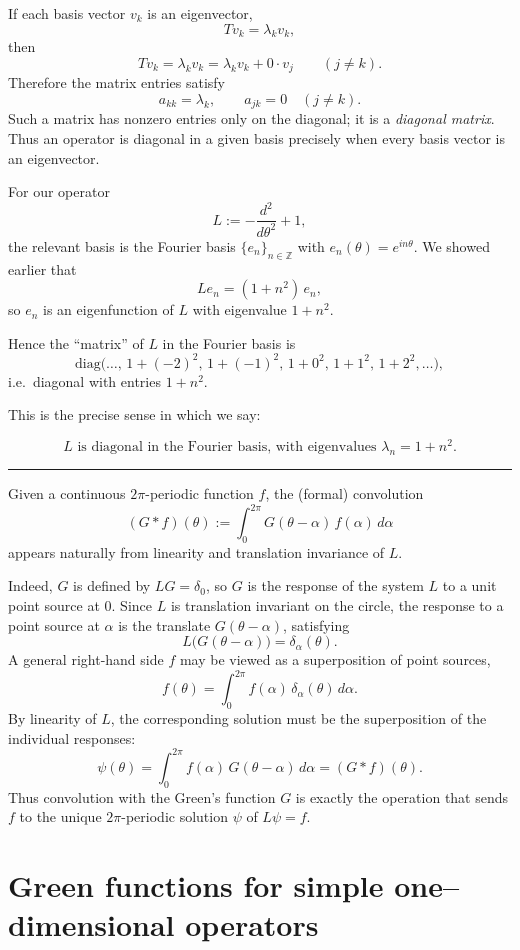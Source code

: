 \documentclass[12pt,a4paper]{article}
\theoremstyle{plain}
\theoremstyle{definition}
\theoremstyle{remark}
\theoremstyle{remark}
\begin{document}
If each basis vector $v_k$ is an eigenvector,
\[
T v_k = \lambda_k v_k,
\]
then
\[
T v_k = \lambda_k v_k
= \lambda_k v_k + 0\cdot v_j \qquad (j\neq k).
\]
Therefore the matrix entries satisfy
\[
a_{kk} = \lambda_k, \qquad a_{jk}=0 \quad (j\neq k).
\]
Such a matrix has nonzero entries only on the diagonal; it is a
\emph{diagonal matrix}.  Thus an operator is diagonal in a given basis
precisely when every basis vector is an eigenvector.

\medskip

For our operator
\[
L := -\frac{d^2}{d\theta^2} + 1,
\]
the relevant basis is the Fourier basis $\{e_n\}_{n\in\mathbb{Z}}$ with
$e_n(\theta)=e^{in\theta}$.  We showed earlier that
\[
L e_n = (1+n^2)\,e_n,
\]
so $e_n$ is an eigenfunction of $L$ with eigenvalue $1+n^2$.

Hence the ``matrix'' of $L$ in the Fourier basis is
\[
\mathrm{diag}\bigl(\dots,\,
1+(-2)^2,\,
1+(-1)^2,\,
1+0^2,\,
1+1^2,\,
1+2^2,\dots
\bigr),
\]
i.e.\ diagonal with entries $1+n^2$.

\medskip

This is the precise sense in which we say:

\[
\boxed{\,L \text{ is diagonal in the Fourier basis, with eigenvalues }
	\lambda_n = 1+n^2.\,}
\]


\bigskip
\noindent\rule{\textwidth}{0.4pt}
\medskip

Given a continuous $2\pi$-periodic function $f$, the (formal) convolution
\[
(G * f)(\theta) := \int_0^{2\pi} G(\theta-\alpha)\,f(\alpha)\,d\alpha
\]
appears naturally from linearity and translation invariance of $L$.

Indeed, $G$ is defined by $L G = \delta_0$, so $G$ is the response of the
system $L$ to a unit point source at $0$.  Since $L$ is translation
invariant on the circle, the response to a point source at $\alpha$ is the
translate $G(\theta-\alpha)$, satisfying
\[
L\big(G(\theta-\alpha)\big) = \delta_\alpha(\theta).
\]
A general right-hand side $f$ may be viewed as a superposition of point
sources,
\[
f(\theta) = \int_0^{2\pi} f(\alpha)\,\delta_\alpha(\theta)\,d\alpha.
\]
By linearity of $L$, the corresponding solution must be the superposition
of the individual responses:
\[
\psi(\theta)
= \int_0^{2\pi} f(\alpha)\,G(\theta-\alpha)\,d\alpha
= (G * f)(\theta).
\]
Thus convolution with the Green's function $G$ is exactly the operation
that sends $f$ to the unique $2\pi$-periodic solution $\psi$ of $L\psi=f$.


\section*{Green functions for simple one–dimensional operators}
\end{document}
